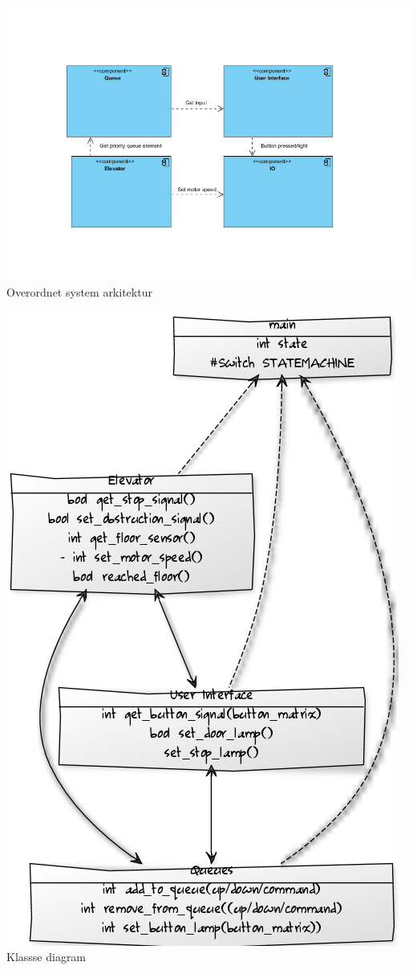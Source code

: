 \documentclass[pdftex,12pt,a4paper]{article}
\begin{document}
\begin{center}
\includegraphics[scale=0.7]{./overordnet_diagram.jpg}
\\Overordnet system arkitektur
\end{center}

\begin{center}
\includegraphics[scale=0.71]{./class_diagram.png}
\\Klassse diagram
\end{center}
\end{document}
